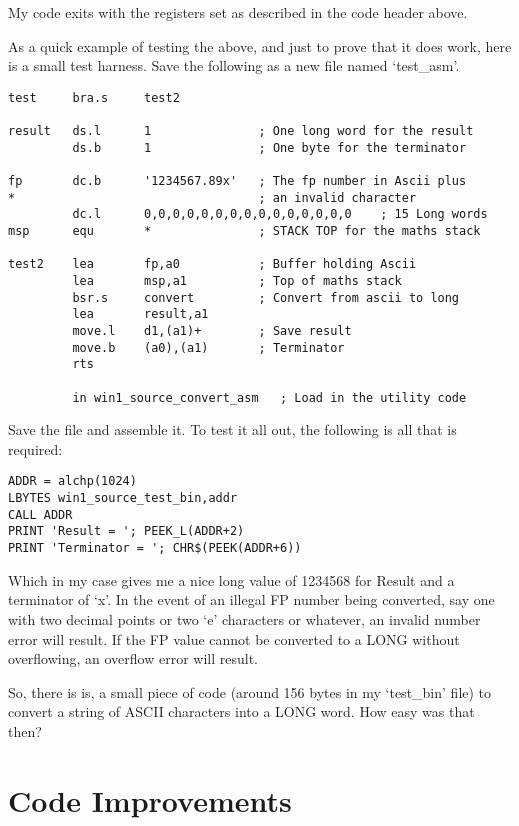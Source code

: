 My code exits with the registers set as described in the code header above.

As a quick example of testing the above, and just to prove that it does work,
here is a small test harness. Save the following as a new file named `test\_asm'.

\begin{lstlisting}[firstnumber=1,caption={ASCII to LONG Converter - Test Harness}]
test     bra.s     test2

result   ds.l      1               ; One long word for the result
         ds.b      1               ; One byte for the terminator

fp       dc.b      '1234567.89x'   ; The fp number in Ascii plus
*                                  ; an invalid character
         dc.l      0,0,0,0,0,0,0,0,0,0,0,0,0,0,0    ; 15 Long words
msp      equ       *               ; STACK TOP for the maths stack

test2    lea       fp,a0           ; Buffer holding Ascii
         lea       msp,a1          ; Top of maths stack
         bsr.s     convert         ; Convert from ascii to long
         lea       result,a1
         move.l    d1,(a1)+        ; Save result
         move.b    (a0),(a1)       ; Terminator
         rts
         
         in win1_source_convert_asm   ; Load in the utility code
\end{lstlisting}

Save the file and assemble it. To test it all out, the following is all that is
required:

\begin{lstlisting}[firstnumber=1,language={}]
ADDR = alchp(1024)
LBYTES win1_source_test_bin,addr
CALL ADDR
PRINT 'Result = '; PEEK_L(ADDR+2)
PRINT 'Terminator = '; CHR$(PEEK(ADDR+6))
\end{lstlisting}

Which in my case gives me a nice long value of 1234568 for Result and a
terminator of `x'. In the event of an illegal FP number being converted, say one
with two decimal points or two `e' characters or whatever, an invalid number
error will result. If the FP value cannot be converted to a LONG without
overflowing, an overflow error will result.

So, there is is, a small piece of code (around 156 bytes in my `test\_bin' file)
to convert a string of ASCII characters into a LONG word. How easy was that
then?

\section{Code Improvements}
\label{ch18-more-code}%

